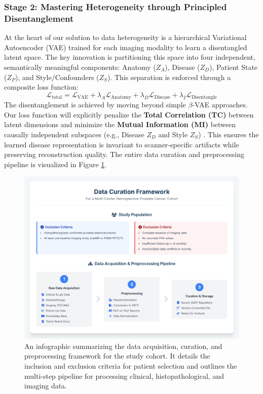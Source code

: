 \documentclass[11pt, a4paper]{article}
\begin{document}
\subsubsection{Stage 2: Mastering Heterogeneity through Principled Disentanglement}
At the heart of our solution to data heterogeneity is a hierarchical Variational Autoencoder (VAE) trained for each imaging modality to learn a disentangled latent space. The key innovation is partitioning this space into four independent, semantically meaningful components: Anatomy ($Z_A$), Disease ($Z_D$), Patient State ($Z_P$), and Style/Confounders ($Z_S$). This separation is enforced through a composite loss function:
$$ \mathcal{L}_{\text{total}} = \mathcal{L}_{\text{VAE}} + \lambda_A \mathcal{L}_{\text{Anatomy}} + \lambda_D \mathcal{L}_{\text{Disease}} + \lambda_I \mathcal{L}_{\text{Disentangle}} $$
The disentanglement is achieved by moving beyond simple $\beta$-VAE approaches. Our loss function will explicitly penalize the \textbf{Total Correlation (TC)} between latent dimensions and minimize the \textbf{Mutual Information (MI)} between causally independent subspaces (e.g., Disease $Z_D$ and Style $Z_S$) \cite{FragemannArdizzone2022, AbbasiMonadjemi2018, FayCobos2023}. This ensures the learned disease representation is invariant to scanner-specific artifacts while preserving reconstruction quality. The entire data curation and preprocessing pipeline is visualized in Figure \ref{fig:data_curation}.

\begin{figure}[H]
    \centering
    \includegraphics[width=\textwidth]{dc.png}
    \caption{An infographic summarizing the data acquisition, curation, and preprocessing framework for the study cohort. It details the inclusion and exclusion criteria for patient selection and outlines the multi-step pipeline for processing clinical, histopathological, and imaging data.}
    \label{fig:data_curation}
\end{figure}
\end{document}
